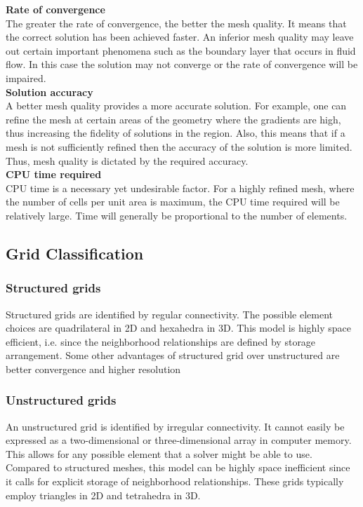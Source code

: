 \textbf{Rate of convergence}
\\
The greater the rate of convergence, the better the mesh quality. It means that the correct solution has been achieved faster. An inferior mesh quality may leave out certain important phenomena such as the boundary layer that occurs in fluid flow. In this case the solution may not converge or the rate of convergence will be impaired.
\\
\textbf{Solution accuracy}
\\
A better mesh quality provides a more accurate solution. For example, one can refine the mesh at certain areas of the geometry where the gradients are high, thus increasing the fidelity of solutions in the region. Also, this means that if a mesh is not sufficiently refined then the accuracy of the solution is more limited. Thus, mesh quality is dictated by the required accuracy.
\\
\textbf{CPU time required}
\\
CPU time is a necessary yet undesirable factor. For a highly refined mesh, where the number of cells per unit area is maximum, the CPU time required will be relatively large. Time will generally be proportional to the number of elements.
\\

\subsection{Grid Classification}

\subsubsection{Structured grids}

Structured grids are identified by regular connectivity. The possible element choices are quadrilateral in 2D and hexahedra in 3D. This model is highly space efficient, i.e. since the neighborhood relationships are defined by storage arrangement. Some other advantages of structured grid over unstructured are better convergence and higher resolution

\subsubsection{Unstructured grids}

An unstructured grid is identified by irregular connectivity. It cannot easily be expressed as a two-dimensional or three-dimensional array in computer memory. This allows for any possible element that a solver might be able to use. Compared to structured meshes, this model can be highly space inefficient since it calls for explicit storage of neighborhood relationships. These grids typically employ triangles in 2D and tetrahedra in 3D. 

